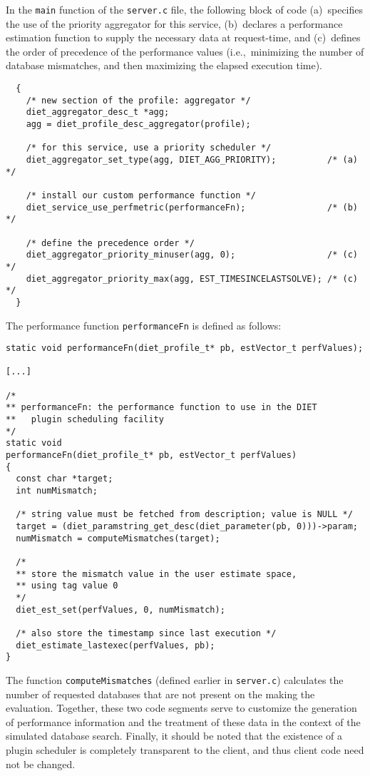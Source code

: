 In the \texttt{main} function of the \texttt{server.c} file, the
following block of code (a)~specifies the use of the priority
aggregator for this service, (b)~declares a performance estimation
function to supply the necessary data at request-time, and
(c)~defines the order of precedence of the performance values
(i.e.,~minimizing the number of database mismatches, and then
maximizing the elapsed execution time).
\begin{verbatim}
  {
    /* new section of the profile: aggregator */
    diet_aggregator_desc_t *agg;
    agg = diet_profile_desc_aggregator(profile);

    /* for this service, use a priority scheduler */
    diet_aggregator_set_type(agg, DIET_AGG_PRIORITY);          /* (a) */

    /* install our custom performance function */
    diet_service_use_perfmetric(performanceFn);                /* (b) */

    /* define the precedence order */
    diet_aggregator_priority_minuser(agg, 0);                  /* (c) */
    diet_aggregator_priority_max(agg, EST_TIMESINCELASTSOLVE); /* (c) */
  }
\end{verbatim}
The performance function \texttt{performanceFn} is defined as follows:
\begin{verbatim}
static void performanceFn(diet_profile_t* pb, estVector_t perfValues);

[...]

/*
** performanceFn: the performance function to use in the DIET
**   plugin scheduling facility
*/
static void
performanceFn(diet_profile_t* pb, estVector_t perfValues)
{
  const char *target;
  int numMismatch;

  /* string value must be fetched from description; value is NULL */
  target = (diet_paramstring_get_desc(diet_parameter(pb, 0)))->param;
  numMismatch = computeMismatches(target);

  /*
  ** store the mismatch value in the user estimate space,
  ** using tag value 0
  */
  diet_est_set(perfValues, 0, numMismatch);

  /* also store the timestamp since last execution */
  diet_estimate_lastexec(perfValues, pb);
}
\end{verbatim}
The function \texttt{computeMismatches} (defined earlier in
\texttt{server.c}) calculates the number of requested databases that
are not present on the {\sed} making the evaluation.
Together, these two code segments serve to customize the generation of
performance information and the treatment of these data in the context
of the simulated database search.
Finally, it should be noted that the existence of a plugin scheduler
is completely transparent to the client, and thus client code need not
be changed.

